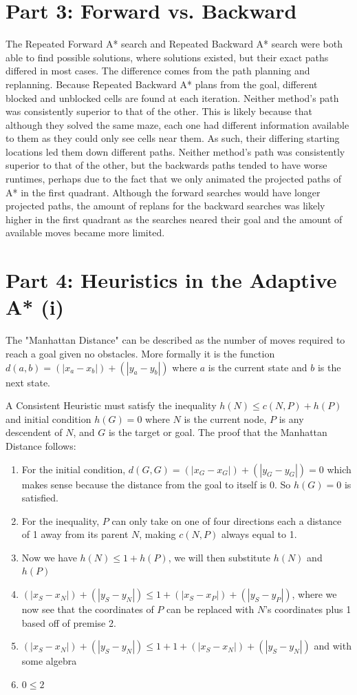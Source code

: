 \documentclass[a4paper,12pt]{article}
\begin{document}
\section{Part 3: Forward vs. Backward}
The Repeated Forward A* search and Repeated Backward A* search were both able to find possible solutions, where solutions existed, but their exact paths differed in most cases. The difference comes from the path planning and replanning. Because Repeated Backward A* plans from the goal, different blocked and unblocked cells are found at each iteration. Neither method’s path was consistently superior to that of the other. This is likely because that although they solved the same maze, each one had different information available to them as they could only see cells near them. As such, their differing starting locations led them down different paths. Neither method’s path was consistently superior to that of the other, but the backwards paths tended to have worse runtimes, perhaps due to the fact that we only animated the projected paths of A* in the first quadrant. Although the forward searches would have longer projected paths, the amount of replans for the backward searches was likely higher in the first quadrant as the searches neared their goal and the amount of available moves became more limited.

\section{Part 4: Heuristics in the Adaptive A* (i)}
The "Manhattan Distance" can be described as the number of moves required to reach a goal given no obstacles. More formally it is the function $d(a , b) = (|x_{a} - x_{b}|) + (|y_{a} - y_{b}|)$ where $a$ is the current state and $b$ is the next state.

 A Consistent Heuristic must satisfy the inequality $h(N) \leq c(N , P) + h(P)$ and initial condition $h(G) = 0$ where $N$ is the current node, $P$ is any descendent of $N$, and $G$ is the target or goal. The proof that the Manhattan Distance follows:

\begin{enumerate}
\item For the initial condition, $d(G , G) = (|x_{G} - x_{G}|) + (|y_{G} - y_{G}|) = 0$ which makes sense because the distance from the goal to itself is 0. So $h(G) = 0$ is satisfied. 
\item For the inequality, $P$ can only take on one of four directions each a distance of 1 away from its parent $N$, making $c(N , P)$ always equal to 1. 
\item Now we have $h(N) \leq 1 + h(P)$, we will then substitute $h(N)$ and $h(P)$
\item $(|x_{S} - x_{N}|) + (|y_{S} - y_{N}|) \leq 1 + (|x_{S} - x_{P}|) + (|y_{S} - y_{P}|)$, where we now see that the coordinates of $P$ can be replaced with $N$'s coordinates plus 1 based off of premise 2.
\item $(|x_{S} - x_{N}|) + (|y_{S} - y_{N}|) \leq 1 + 1 + (|x_{S} - x_{N}|) + (|y_{S} - y_{N}|)$ and with some algebra 
\item $0\leq2$
\end{enumerate}
\end{document}
